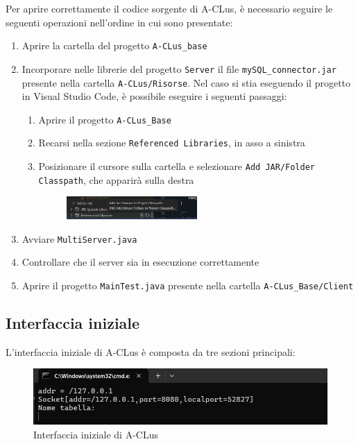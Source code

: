 Per aprire correttamente il codice sorgente di A-CLus, è necessario seguire le seguenti operazioni nell'ordine in cui sono presentate:

\begin{enumerate}
    \item Aprire la cartella del progetto \texttt{A-CLus\_base}
    \item Incorporare nelle librerie del progetto \texttt{Server} il file \texttt{mySQL\_connector.jar} presente nella cartella \texttt{A-CLus/Risorse}. Nel caso si stia eseguendo il progetto in Visual Studio Code, è possibile eseguire i seguenti passaggi:
    \begin{enumerate}
        \item Aprire il progetto \texttt{A-CLus\_Base}
        \item Recarsi nella sezione \texttt{Referenced Libraries}, in asso a sinistra
        \item Posizionare il cursore sulla cartella e selezionare \texttt{Add JAR/Folder Classpath}, che apparirà sulla destra
        \begin{figure}[h!]
            \centering
            \includegraphics[width=0.5\textwidth]{images/refenereziare il jdbc.png}
        \end{figure}
    \end{enumerate}
    \item Avviare \texttt{MultiServer.java}
    \item Controllare che il server sia in esecuzione correttamente
    \item Aprire il progetto \texttt{MainTest.java} presente nella cartella \texttt{A-CLus\_Base/Client}
\end{enumerate}

\subsection{Interfaccia iniziale}

L'interfaccia iniziale di A-CLus è composta da tre sezioni principali:

\begin{figure}[h!]
    \centering
    \includegraphics[width=\textwidth]{images/client in esecuzione.png}
    \caption{Interfaccia iniziale di A-CLus}
\end{figure}

